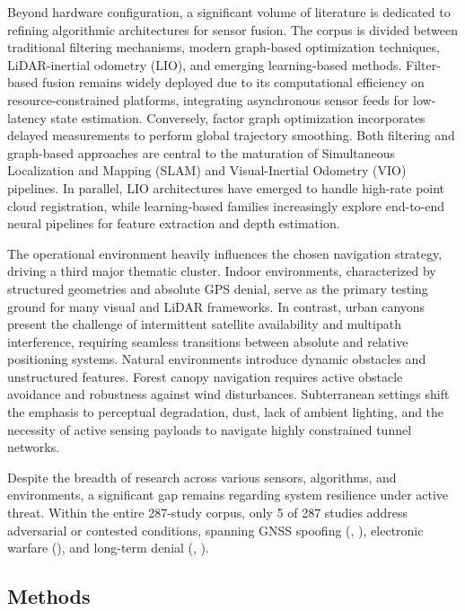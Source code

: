 \documentclass[conference]{IEEEtran}
\begin{document}
Beyond hardware configuration, a significant volume of literature is dedicated to refining algorithmic architectures for sensor fusion. The corpus is divided between traditional filtering mechanisms, modern graph-based optimization techniques, LiDAR-inertial odometry (LIO), and emerging learning-based methods. Filter-based fusion remains widely deployed due to its computational efficiency on resource-constrained platforms, integrating asynchronous sensor feeds for low-latency state estimation. Conversely, factor graph optimization incorporates delayed measurements to perform global trajectory smoothing. Both filtering and graph-based approaches are central to the maturation of Simultaneous Localization and Mapping (SLAM) and Visual-Inertial Odometry (VIO) pipelines. In parallel, LIO architectures have emerged to handle high-rate point cloud registration, while learning-based families increasingly explore end-to-end neural pipelines for feature extraction and depth estimation.


The operational environment heavily influences the chosen navigation strategy, driving a third major thematic cluster. Indoor environments, characterized by structured geometries and absolute GPS denial, serve as the primary testing ground for many visual and LiDAR frameworks. In contrast, urban canyons present the challenge of intermittent satellite availability and multipath interference, requiring seamless transitions between absolute and relative positioning systems. Natural environments introduce dynamic obstacles and unstructured features. Forest canopy navigation requires active obstacle avoidance and robustness against wind disturbances. Subterranean settings shift the emphasis to perceptual degradation, dust, lack of ambient lighting, and the necessity of active sensing payloads to navigate highly constrained tunnel networks.


Despite the breadth of research across various sensors, algorithms, and environments, a significant gap remains regarding system resilience under active threat. Within the entire 287-study corpus, only 5 of 287 studies address adversarial or contested conditions, spanning GNSS spoofing (\cite{REC_0010}, \cite{REC_0489}), electronic warfare (\cite{REC_1083}), and long-term denial (\cite{REC_1084}, \cite{REC_1085}).


\subsection{Methods}
\end{document}
